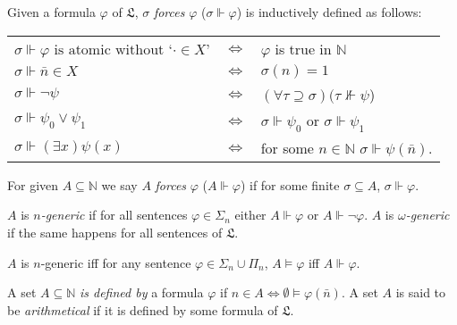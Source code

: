 \documentclass{js}
\newcommand\m[1]{\mathbb { #1 }}
\newcommand\N{\ensuremath{\m N}}
\let \forces \Vdash
\begin{document}
\begin{definition}
    Given a formula $\varphi$ of $\mathfrak L$, $\sigma$ \emph{forces} $\varphi$ ($\sigma \forces \varphi$) is inductively defined as follows:

    \begin{tabular}{l c l}
        $\sigma \forces \varphi \text{ is atomic without `} \cdot \in X$' & $\iff$ & $\varphi$ is true in \N \\
        $\sigma \forces \bar n \in X$ & $\iff$ & $\sigma(n) = 1$ \\
        $\sigma \forces \neg \psi$ & $\iff$ & $(\forall \tau \supseteq \sigma)(\tau \not\forces \psi$) \\
        $\sigma \forces \psi_0 \lor \psi_1$ & $\iff$ &  $\sigma \forces \psi_0$ or $\sigma \forces \psi_1$ \\
        $\sigma \forces (\exists x)\psi(x)$ & $\iff$ &for some $n\in\N$ $\sigma \forces \psi(\bar{n})$. \\
    \end{tabular}
\end{definition}

\begin{definition}
    For given $A \subseteq \N$ we say $A$ \emph{forces} $\varphi$ ($A \forces \varphi$) if for some finite $\sigma \subseteq A$, $\sigma \forces \varphi$.
\end{definition}


\begin{definition}
    $A$ is \emph{$n$-generic} if for all sentences $\varphi \in \Sigma_n$ either $A \forces \varphi$ or $A \forces \neg\varphi$. $A$ is \emph{$\omega$-generic} if the same happens for all sentences of $\mathfrak L$.
\end{definition}

\begin{lemma}[Forcing = Truth for generic sets]
    $A$ is $n$-generic iff for any sentence $\varphi \in \Sigma_n \cup \Pi_n$, $A \models \varphi$ iff $A \forces \varphi$.
\end{lemma}


\begin{definition}
    A set $A \subseteq \N$ \emph{is defined by} a formula $\varphi$ if $n \in A \iff \emptyset \models \varphi(\bar{n})$. A set $A$ is said to be \emph{arithmetical} if it is defined by some formula of $\mathfrak L$.
\end{definition}
\end{document}
